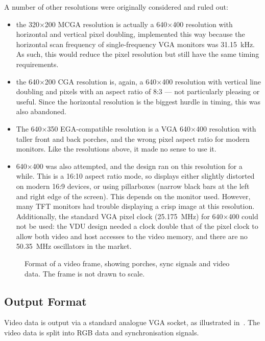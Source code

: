 A number of other resolutions were originally considered and ruled out:

\begin{itemize}
\item the 320×200 MCGA resolution is actually a 640×400 resolution with
  horizontal and vertical pixel doubling, implemented this way because the
  horizontal scan frequency of single-frequency VGA monitors was 31.15~kHz. As
  such, this would reduce the pixel resolution but still have the same timing
  requirements.
\item the 640×200 CGA resolution is, again, a 640×400 resolution with vertical
  line doubling and pixels with an aspect ratio of 8:3 — not particularly
  pleasing or useful. Since the horizontal resolution is the biggest hurdle in
  timing, this was also abandoned.
\item The 640×350 EGA-compatible resolution is a VGA 640×400 resolution with taller front
  and back porches, and the wrong pixel aspect ratio for modern monitors. Like
  the resolutions above, it made no sense to use it.
\item 640×400 was also attempted, and the design ran on this resolution for a
  while.  This is a 16:10 aspect ratio mode, so displays either slightly
  distorted on modern 16:9 devices, or using pillarboxes (narrow black bars at
  the left and right edge of the screen). This depends on the monitor
  used. However, many TFT monitors had trouble displaying a crisp image at this
  resolution. Additionally, the standard VGA pixel clock (25.175~MHz) for
  640×400 could not be used: the VDU design needed a clock double that of the
  pixel clock to allow both video and host accesses to the video memory, and
  there are no 50.35~MHz oscillators in the market.
\end{itemize}



\begin{figure}
 \centering     
 
 \caption[Video frame format]{\label{fig:video-frame-format} Format of a video
   frame, showing porches, sync signals and video data. The frame is not drawn
   to scale.}
\end{figure}



\subsection{Output Format}

Video data is output via a standard analogue VGA socket, as illustrated
in~. The video data is split into RGB data and
synchronisation signals.

